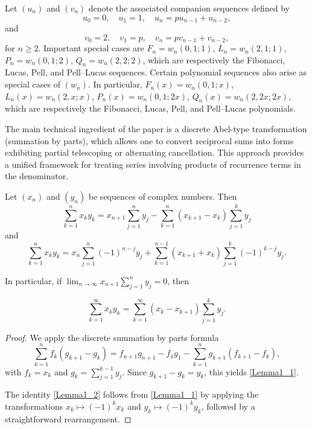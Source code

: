 \documentclass[12pt,reqno]{article}
\begin{document}
Let $(u_n)$ and $(v_n)$ denote the associated companion sequences defined by
	\begin{equation*}
	u_0=0,\quad u_1=1,\quad
	u_n=pu_{n-1}+u_{n-2},
	\end{equation*}
and
\begin{equation*}
	v_0=2,\quad v_1=p,\quad
	v_n=pv_{n-1}+v_{n-2},
	\end{equation*}
for $n\ge2$. Important special cases are
$F_n=w_n(0,1;1)$, $L_n=w_n(2,1;1)$, $P_n=w_n(0,1;2)$, $Q_n=w_n(2,2;2)$,
which are respectively the Fibonacci, Lucas, Pell, and Pell--Lucas sequences.
Certain polynomial sequences also arise as special cases of $(w_n)$. In particular,
$F_n(x)=w_n(0,1;x)$, $L_n(x)=w_n(2,x;x)$, $P_n(x)=w_n(0,1;2x)$, $Q_n(x)=w_n(2,2x;2x)$, which are respectively the Fibonacci, Lucas, Pell, and Pell--Lucas polynomials.

The main technical ingredient of the paper is a discrete Abel-type transformation (summation by parts), which allows one to convert reciprocal sums into forms exhibiting partial telescoping or alternating cancellation. This approach provides a unified framework for treating series involving products of recurrence terms in the denominator.
\begin{lemma}\label{main_lem}
	Let $(x_n)$ and $(y_n)$ be sequences of complex numbers. Then
	\begin{equation}\label{Lemma1_1}
		\sum_{k=1}^n x_k y_k = x_{n+1} \sum_{j=1}^n y_j - \sum_{k=1}^n (x_{k+1} - x_k)\sum_{j=1}^k y_j
		\end{equation}
and
	\begin{equation}\label{Lemma1_2}
		\sum_{k=1}^n x_k y_k = x_{n} \sum_{j=1}^n (-1)^{n-j} y_j + \sum_{k=1}^{n-1} (x_{k+1} + x_k)\sum_{j=1}^k (-1)^{k-j} y_j.
		\end{equation}
		
	In particular, if $\lim_{n\to\infty} {x_{n + 1} \sum_{j = 1}^n {y_j }}=0$, then
	
		\begin{equation}\label{Lem1_infty}
		\sum_{k = 1}^\infty  {x_k y_k }  = \sum_{k = 1}^\infty  {\left( {x_k  - x_{k + 1} } \right)\sum_{j = 1}^k {y_j } } .
		\end{equation}
\end{lemma}
\begin{proof} We apply the discrete summation by parts formula
		\begin{equation*}
		\sum_{k=1}^n f_k (g_{k+1}-g_k) = f_{n+1}g_{n+1}-f_1 g_1 - \sum_{k=1}^n g_{k+1}(f_{k+1}-f_k),
		\end{equation*}
	with $f_k = x_k$ and $g_k = \sum_{j=1}^{k-1} y_j$. 
	Since $g_{k+1}-g_k = y_k$, this yields \eqref{Lemma1_1}.
	
	The identity \eqref{Lemma1_2} follows from \eqref{Lemma1_1} by applying the transformations $x_k \mapsto (-1)^k x_k$ and $y_k \mapsto (-1)^k y_k$, followed by a straightforward rearrangement.
\end{proof}
\end{document}
